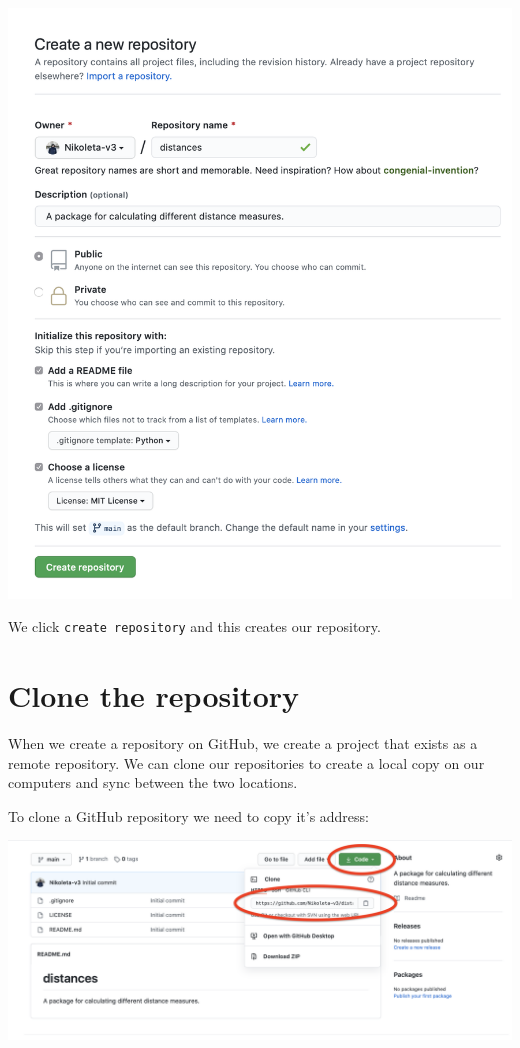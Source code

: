 \documentclass[11pt]{article}
\begin{document}
    \includegraphics{static/creating_a_repo_part_two.png}

    We click \texttt{create\ repository} and this creates our repository.

    \hypertarget{clone-the-repository}{%
\section{Clone the repository}\label{clone-the-repository}}

When we create a repository on GitHub, we create a project that exists
as a remote repository. We can clone our repositories to create a local
copy on our computers and sync between the two locations.

To clone a GitHub repository we need to copy it's address:

\includegraphics{static/repository_s_address.png}
\end{document}
